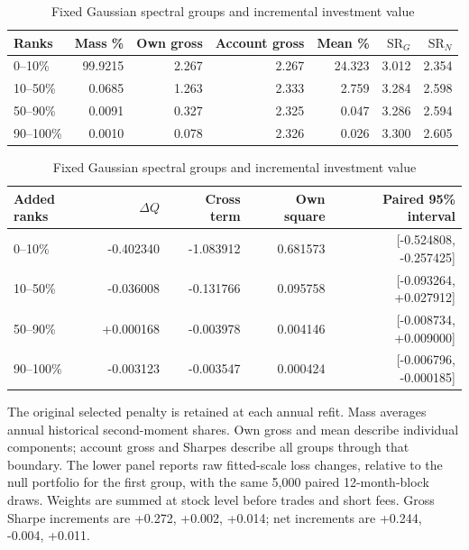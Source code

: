 \begin{table}[H]\centering\small\setlength{\tabcolsep}{5pt}
\caption{Fixed Gaussian spectral groups and incremental investment value}\label{tab:spectral_value}
\begin{tabular}{@{}lrrrrrr@{}}\toprule
Ranks & Mass \% & Own gross & Account gross & Mean \% & $\mathrm{SR}_G$ & $\mathrm{SR}_N$ \\ \midrule
0--10\% & 99.9215 & 2.267 & 2.267 & 24.323 & 3.012 & 2.354 \\
10--50\% & 0.0685 & 1.263 & 2.333 & 2.759 & 3.284 & 2.598 \\
50--90\% & 0.0091 & 0.327 & 2.325 & 0.047 & 3.286 & 2.594 \\
90--100\% & 0.0010 & 0.078 & 2.326 & 0.026 & 3.300 & 2.605 \\
\bottomrule\end{tabular}\par\vspace{5pt}
\par\vspace{9pt}\begin{tabular}{@{}lrrrr@{}}\toprule
Added ranks & $\Delta Q$ & Cross term & Own square & Paired 95\% interval \\ \midrule
0--10\% & -0.402340 & -1.083912 & 0.681573 & [-0.524808, -0.257425] \\
10--50\% & -0.036008 & -0.131766 & 0.095758 & [-0.093264, +0.027912] \\
50--90\% & +0.000168 & -0.003978 & 0.004146 & [-0.008734, +0.009000] \\
90--100\% & -0.003123 & -0.003547 & 0.000424 & [-0.006796, -0.000185] \\
\bottomrule\end{tabular}\par\vspace{5pt}
\begin{minipage}{\textwidth}\footnotesize The original selected penalty is retained at each annual refit. Mass averages annual historical second-moment shares. Own gross and mean describe individual components; account gross and Sharpes describe all groups through that boundary. The lower panel reports raw fitted-scale loss changes, relative to the null portfolio for the first group, with the same 5,000 paired 12-month-block draws. Weights are summed at stock level before trades and short fees. Gross Sharpe increments are +0.272, +0.002, +0.014; net increments are +0.244, -0.004, +0.011.\end{minipage}\end{table}
